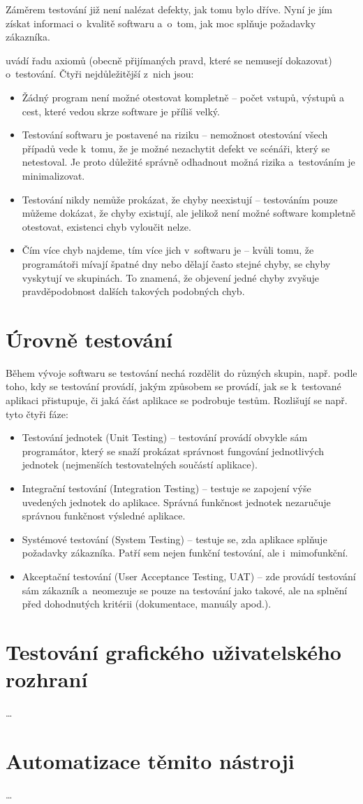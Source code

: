 	Záměrem testování již není nalézat defekty, jak tomu bylo dříve. Nyní je jím získat informaci o~kvalitě softwaru a~o~tom, jak moc splňuje požadavky zákazníka.
	
	\citep{Patton} uvádí řadu axiomů (obecně přijímaných pravd, které se nemusejí dokazovat) o~testování. Čtyři nejdůležitější z~nich jsou:
		\begin{itemize}
			\item Žádný program není možné otestovat kompletně -- počet vstupů, výstupů a cest, které vedou skrze software je příliš velký.
			\item Testování softwaru je postavené na riziku -- nemožnost otestování všech případů vede k~tomu, že je možné nezachytit defekt ve scénáři, který se netestoval. Je proto důležité správně odhadnout možná rizika a~testováním je minimalizovat.
			\item Testování nikdy nemůže prokázat, že chyby neexistují -- testováním pouze můžeme dokázat, že chyby existují, ale jelikož není možné software kompletně otestovat, existenci chyb vyloučit nelze.
			\item Čím více chyb najdeme, tím více jich v~softwaru je -- kvůli tomu, že programátoři mívají špatné dny nebo dělají často stejné chyby, se chyby vyskytují ve skupinách. To znamená, že objevení jedné chyby zvyšuje pravděpodobnost dalších takových podobných chyb.
		\end{itemize}
		
		\section{Úrovně testování}
		Během vývoje softwaru se testování nechá rozdělit do různých skupin, např. podle toho, kdy se testování provádí, jakým způsobem se provádí, jak se k~testované aplikaci přistupuje, či jaká část aplikace se podrobuje testům. Rozlišují se např. tyto čtyři fáze:
			\begin{itemize}
				\item Testování jednotek (Unit Testing) -- testování provádí obvykle sám programátor, který se snaží prokázat správnost fungování jednotlivých jednotek (nejmenších testovatelných součástí aplikace).
				\item Integrační testování (Integration Testing) -- testuje se zapojení výše uvedených jednotek do aplikace. Správná funkčnost jednotek nezaručuje správnou funkčnost výsledné aplikace.
				\item Systémové testování (System Testing) -- testuje se, zda aplikace splňuje požadavky zákazníka. Patří sem nejen funkční testování, ale i~mimofunkční.
				\item Akceptační testování (User Acceptance Testing, UAT) -- zde provádí testování sám zákazník a~neomezuje se pouze na testování jako takové, ale na splnění před dohodnutých kritérii (dokumentace, manuály apod.).
			\end{itemize}
			
		\section{Testování grafického uživatelského rozhraní}
		\dots
		
		\section{Automatizace těmito nástroji}
		\dots
